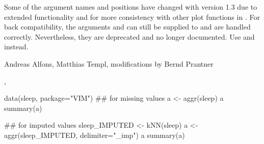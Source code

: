 %
\begin{Note}\relax
Some of the argument names and positions have changed with version 1.3 
due to extended functionality and for more consistency with other plot 
functions in .  For back compatibility, the arguments 
 and  can still be supplied to  
and are handled correctly.  Nevertheless, they are deprecated and no 
longer documented.  Use  and  instead.
\end{Note}
%
\begin{Author}\relax
Andreas Alfons, Matthias Templ, modifications by Bernd Prantner
\end{Author}
%
\begin{SeeAlso}\relax
{}, 
\end{SeeAlso}
%
\begin{Examples}
\begin{ExampleCode}
data(sleep, package="VIM")
## for missing values
a <- aggr(sleep)
a
summary(a)

## for imputed values
sleep_IMPUTED <- kNN(sleep)
a <- aggr(sleep_IMPUTED, delimiter="_imp")
a
summary(a)
\end{ExampleCode}
\end{Examples}
